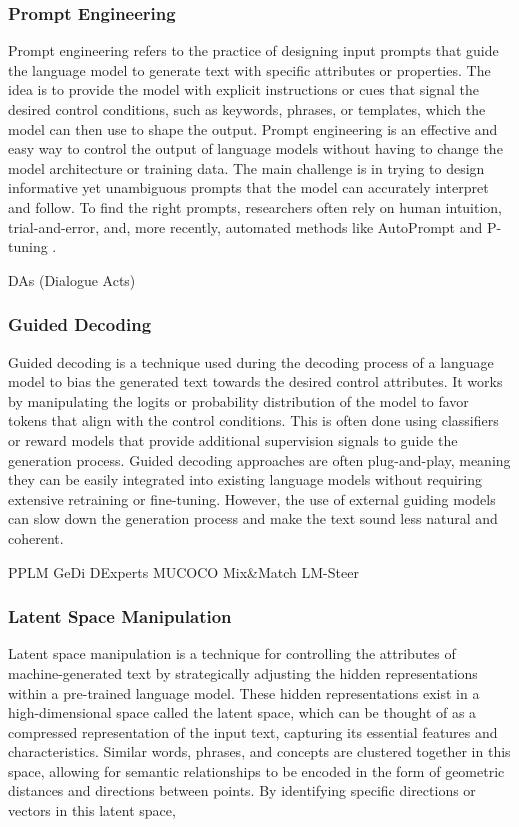\subsubsection{Prompt Engineering}
Prompt engineering refers to the practice of designing input prompts that guide the language model to generate text with specific attributes or properties. 
The idea is to provide the model with explicit instructions or cues that signal the desired control conditions, such as keywords, phrases, or templates, which the model can then use to shape the output.
Prompt engineering is an effective and easy way to control the output of language models without having to change the model architecture or training data.
The main challenge is in trying to design informative yet unambiguous prompts that the model can accurately interpret and follow.
To find the right prompts, researchers often rely on human intuition, trial-and-error, and, more recently, automated methods like AutoPrompt \cite{shin2022autoprompt} and P-tuning \cite{peng2022ptuning}.

DAs (Dialogue Acts)

\subsubsection{Guided Decoding}
Guided decoding is a technique used during the decoding process of a language model to bias the generated text towards the desired control attributes. 
It works by manipulating the logits or probability distribution of the model to favor tokens that align with the control conditions.
This is often done using classifiers or reward models that provide additional supervision signals to guide the generation process.
Guided decoding approaches are often plug-and-play, meaning they can be easily integrated into existing language models without requiring extensive retraining or fine-tuning.
However, the use of external guiding models can slow down the generation process and make the text sound less natural and coherent.

PPLM
GeDi
DExperts
MUCOCO
Mix&Match
LM-Steer

\subsubsection{Latent Space Manipulation}
Latent space manipulation is a technique for controlling the attributes of machine-generated text by strategically adjusting the hidden representations within a pre-trained language model. 
These hidden representations exist in a high-dimensional space called the latent space, which can be thought of as a compressed representation of the input text, capturing its essential features and characteristics.
Similar words, phrases, and concepts are clustered together in this space, allowing for semantic relationships to be encoded in the form of geometric distances and directions between points.
By identifying specific directions or vectors in this latent space, 

